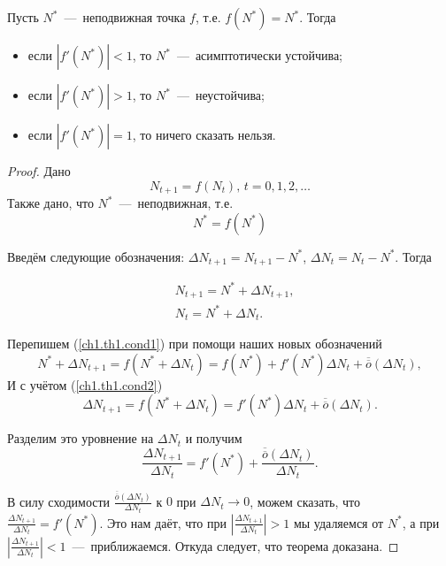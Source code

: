 \begin{theorem}
\label{ch1.th1}
Пусть $N^*$~---~неподвижная точка $f$, т.е. $f(N^*) = N^*$. Тогда
\begin{itemize}

\item если $|f'(N^*)|<1$, то $N^*$~---~асимптотически устойчива;
\item если $|f'(N^*)|>1$, то $N^*$~---~неустойчива;
\item если $|f'(N^*)|=1$, то ничего сказать нельзя.

\end{itemize}	
\end{theorem}
\begin{proof}

Дано
\begin{equation}
\label{ch1.th1.cond1}
N_{t+1} = f(N_t), \, t = 0, 1, 2, \ldots
\end{equation}
Также дано, что $N^*$~---~неподвижная, т.е.
\begin{equation}
\label{ch1.th1.cond2}
N^* = f(N^*)
\end{equation}

Введём следующие обозначения: $\Delta N_{t+1} = N_{t+1} - N^*$, $\Delta N_{t} = N_{t} - N^*$. Тогда 

\begin{equation*}
\begin{aligned}
&N_{t+1} = N^* + \Delta N_{t+1}, \\
&N_{t} = N^* + \Delta N_t.
\end{aligned}
\end{equation*}

Перепишем (\ref{ch1.th1.cond1}) при помощи наших новых обозначений
\begin{equation*}
N^* + \Delta N_{t+1} = f(N^* + \Delta N_t) = f(N^*) + f'(N^*) \Delta N_t + \overline{\overline{o}}(\Delta N_t),
\end{equation*}
И с учётом (\ref{ch1.th1.cond2}) 
\begin{equation*}
\Delta N_{t+1} = f(N^* + \Delta N_t) = f'(N^*) \Delta N_t + \overline{\overline{o}}(\Delta N_t).
\end{equation*}

Разделим это уровнение на $\Delta N_t$ и получим
\begin{equation*}
\frac{\Delta N_{t+1}}{\Delta N_t} = f'(N^*) + \frac{\overline{\overline{o}}(\Delta N_t)}{\Delta N_t}.
\end{equation*}

В силу сходимости $\frac{\overline{\overline{o}}(\Delta N_t)}{\Delta N_t}$ к $0$ при $\Delta N_t \to 0$, можем сказать, что $\frac{\Delta N_{t+1}}{\Delta N_t} = f'(N^*)$. Это нам даёт, что при $\left|\frac{\Delta N_{t+1}}{\Delta N_t}\right| > 1$ мы удаляемся от $N^*$, а при $\left|\frac{\Delta N_{t+1}}{\Delta N_t}\right| < 1$~---~приближаемся. Откуда следует, что теорема доказана.
\end{proof}

